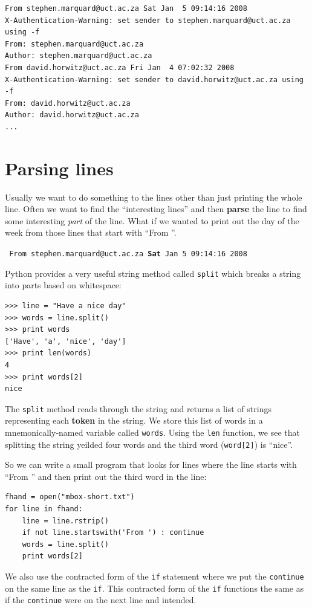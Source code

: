 \documentclass[10pt]{book}
\begin{document}
\beforeverb
\begin{verbatim}
From stephen.marquard@uct.ac.za Sat Jan  5 09:14:16 2008
X-Authentication-Warning: set sender to stephen.marquard@uct.ac.za using -f
From: stephen.marquard@uct.ac.za
Author: stephen.marquard@uct.ac.za
From david.horwitz@uct.ac.za Fri Jan  4 07:02:32 2008
X-Authentication-Warning: set sender to david.horwitz@uct.ac.za using -f
From: david.horwitz@uct.ac.za
Author: david.horwitz@uct.ac.za
...
\end{verbatim}
\afterverb
%

\section{Parsing lines}

Usually we want to do something to the lines other than just 
printing the whole line.  Often we want to find the ``interesting
lines'' and then {\bf parse} the line to find some interesting
{\em part} of the line.  What if we wanted to print out the day of the 
week from those lines that start with ``From ''.

{\tt
From stephen.marquard@uct.ac.za {\bf Sat} Jan  5 09:14:16 2008
}

Python provides a very useful string method called {\tt split}
which breaks a string into parts based on whitespace:

\beforeverb
\begin{verbatim}
>>> line = "Have a nice day"
>>> words = line.split()
>>> print words
['Have', 'a', 'nice', 'day']
>>> print len(words)
4
>>> print words[2]
nice
\end{verbatim}
\afterverb
%
The {\tt split} method reads through the string and returns a
list of strings representing each {\bf token} in the string.
We store this list of words in a mnemonically-named variable
called {\tt words}.  Using the {\tt len} function, we see that
splitting the string yeilded four words and the third word 
({\tt word[2]}) is ``nice''.

So we can write a small program that looks for lines where the 
line starts with ``From '' and then print out the third word in the 
line:

\beforeverb
\begin{verbatim}
fhand = open("mbox-short.txt")
for line in fhand:
    line = line.rstrip()
    if not line.startswith('From ') : continue
    words = line.split()
    print words[2]
\end{verbatim}
\afterverb
%
We also use the contracted form of the {\tt if}
statement where we put the {\tt continue } on the
same line as the {\tt if}.  This contracted form
of the {\tt if} functions the same as if the
{\tt continue} were on the next line and intended.
\end{document}

